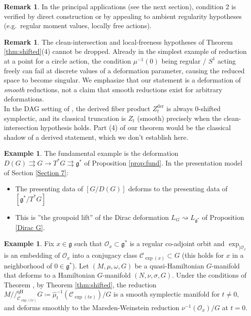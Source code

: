 \documentclass[reqno]{amsart}
\theoremstyle{plain}
\theoremstyle{definition}
\newtheorem{Rem}[Thm]{Remark}
\newtheorem{Exp}[Thm]{Example}
\newcommand{\g}{\mathfrak{g}}
\newcommand{\too}{\longrightarrow}
\newcommand{\C}{\mathcal{C}}
\renewcommand{\O}{\mathcal{O}}
\begin{document}
\begin{Rem}\label{rem:rank-constancy}
In the principal applications (see the next section), condition 2 is verified by direct construction or by appealing to ambient regularity hypotheses (e.g.\ regular moment values, locally free actions).
\end{Rem}
 
\begin{Rem}
The clean-intersection and local-freeness hypotheses of Theorem \ref{thm:shifted}(4) cannot be dropped. Already in the simplest example of reduction at a point for a circle action, the condition $\mu^{-1}(0)$ being regular / $S^1$ acting freely can fail at discrete values of a deformation parameter, causing the reduced space to become singular. We emphasize that our statement is a deformation of \emph{smooth} reductions, not a claim that smooth reductions exist for arbitrary deformations.\\

 
In the DAG setting of \cite{pantev2013shifted,calaque2021derived}, the derived fiber product $Z_t^{\mathrm{der}}$ is always $0$-shifted symplectic, and its classical truncation is $Z_t$ (smooth) precisely when the clean-intersection hypothesis holds. Part (4) of our theorem would be the classical shadow of a derived statement, which we don't establish here.
\end{Rem}

\begin{Exp}
    The fundamental example is the deformation $D(G)\rightrightarrows G \too T^{*}G\rightrightarrows \g^{*}$ of Proposition \ref{prop:fund}. In the presentation model of Section \ref{Section 7}: \begin{itemize}
        \item The presenting data of $[G/D(G)]$ deforms to the presenting data of $[\g^{*}/T^{*}G]$
        \item This is ''the groupoid lift'' of the Dirac deformation $L_G \rightsquigarrow L_{\g^*}$ of Proposition \ref{Dirac G}. 
    \end{itemize}
\end{Exp}

\begin{Exp}
    Fix $x\in \g$ such that $\O_x \subset \g^{*}$ is a regular co-adjoint orbit and $\exp_{|\O_x}$ is an embedding of $\O_x$ into a conjugacy class $\C_{\exp(x)} \subset G$ (this holds for $x$ in a neighborhood of $0\in \g^{*}$). Let $(M,\mu,\omega,G)$ be a quasi-Hamiltonian $G$-manifold that deforms to a Hamiltonian $G$-manifold $(N,\nu,\sigma,G).$ Under the conditions of Theorem \cite[Theorem 3.3]{burelle2026deformations}, by Theorem \ref{thm:shifted}, the reduction $M//_{\C_{\exp(tx)}}^{\text{qH}}G \coloneqq \widehat{\mu}^{-1}_{t}(\C_{\exp(tx)})/G$ is a smooth symplectic manifold for $t\neq 0,$ and deforms smoothly to the Marsden-Weinstein reduction $\nu^{-1}(\O_x)/G$ at $t = 0.$ 
\end{Exp}
\end{document}
